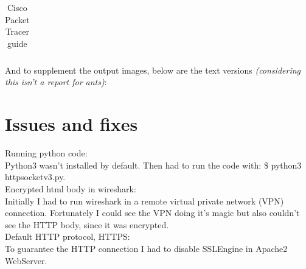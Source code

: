 \documentclass[11pt,a4paper]{report}
\begin{document}
\begin{flushleft}
\begin{center}
\begin{longtable}{ m{5cm} l }
                        \caption{Cisco Packet Tracer guide} \label{tab:cptg2}
                    \end{longtable}
                \end{center}
        \end{flushleft}

        And to supplement the output images, below are the text versions \textit{(considering this isn't a report for ants)}:
        \lstset{style=termoutputs}
        
        
        
        
        

\chapter{Issues and fixes}
    Running python code: \\
        \hspace*{10mm}Python3 wasn't installed by default. Then had to run the code with: \$ python3 httpsocketv3.py. \\
    Encrypted html body in wireshark: \\
        \hspace*{10mm}Initially I had to run wireshark in a remote virtual private network (VPN) connection. Fortunately I could see the VPN doing it's magic but also couldn't see the HTTP body, since it was encrypted. \\
    Default HTTP protocol, HTTPS: \\
        \hspace*{10mm}To guarantee the HTTP connection I had to disable SSLEngine in Apache2 WebServer. \\
\end{document}

